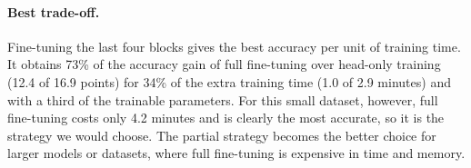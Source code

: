 \paragraph{Best trade-off.}
Fine-tuning the last four blocks gives the best accuracy per unit of training time.
It obtains 73\% of the accuracy gain of full fine-tuning over head-only training (12.4 of 16.9 points) for 34\% of the extra training time (1.0 of 2.9 minutes) and with a third of the trainable parameters.
For this small dataset, however, full fine-tuning costs only 4.2 minutes and is clearly the most accurate, so it is the strategy we would choose.
The partial strategy becomes the better choice for larger models or datasets, where full fine-tuning is expensive in time and memory.
